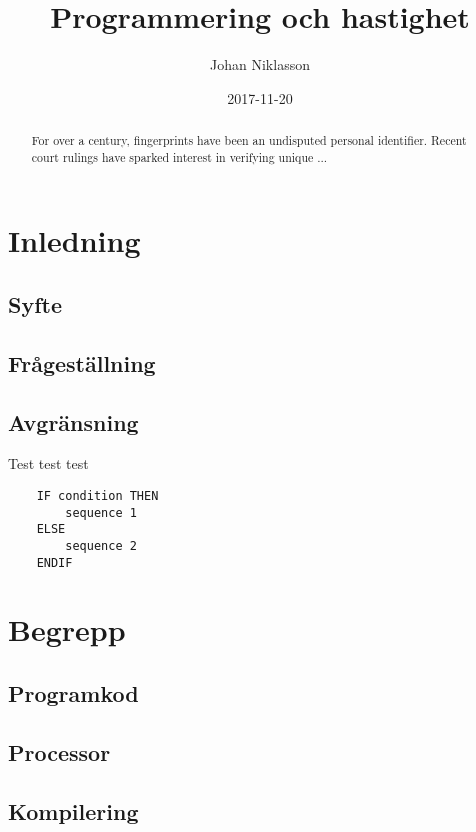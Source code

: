 \documentclass[12pt,swedish]{article}
\title{Programmering och hastighet}
\author{Johan Niklasson}
\date{2017-11-20}
\begin{document}
    \maketitle
    \normalsize
    \begin{center}
        \begin{abstract}
            For over a century, fingerprints have been an undisputed
            personal identifier.  Recent court rulings have sparked
            interest in verifying unique ...
        \end{abstract}
    \end{center}
    \clearpage

    \tableofcontents
    \clearpage

    \section{Inledning}
    \subsection{Syfte}
    \subsection{Frågeställning}
    \subsection{Avgränsning}
    Test test test \cite{maloney_resnick_rusk_silverman_eastmond_2010}

    \begin{lstlisting}
    IF condition THEN
        sequence 1
    ELSE
        sequence 2
    ENDIF
    \end{lstlisting}

    \section{Begrepp}
    \subsection{Programkod}
    \subsection{Processor}
    \subsection{Kompilering}
\end{document}
